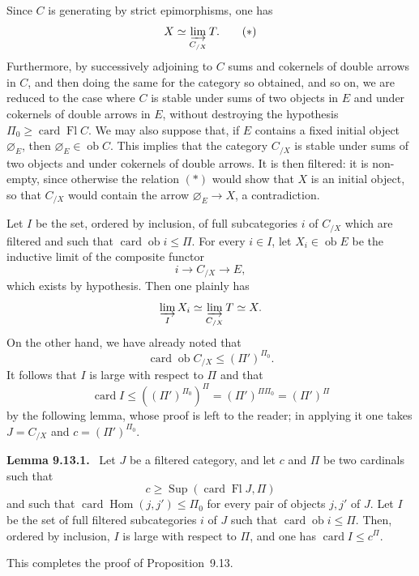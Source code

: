 \documentclass[11pt]{article}
\newcommand{\ob}{\operatorname{ob}}
\newcommand{\Hom}{\operatorname{Hom}}
\newcommand{\Sup}{\operatorname{Sup}}
\newcommand{\card}{\operatorname{card}}
\newcommand{\Fl}{\operatorname{Fl}}
\newcommand{\emptyE}{\varnothing_E}
\newenvironment{statement}[1]{\par\medskip\noindent\textbf{#1.}\ }{\par\medskip}
\begin{document}
Since $C$ is generating by strict epimorphisms, one has
\begin{equation*}
 X\simeq \varinjlim_{C_{/X}} T .\tag{$\ast$}
\end{equation*}
Furthermore, by successively adjoining to $C$ sums and cokernels of double arrows in $C$, and then doing the same for the category so obtained, and so on, we are reduced to the case where $C$ is stable under sums of two objects in $E$ and under cokernels of double arrows in $E$, without destroying the hypothesis $\Pi_0\geq\card\Fl C$. We may also suppose that, if $E$ contains a fixed initial object $\emptyE$, then $\emptyE\in\ob C$. This implies that the category $C_{/X}$ is stable under sums of two objects and under cokernels of double arrows. It is then filtered: it is non-empty, since otherwise the relation $(\ast)$ would show that $X$ is an initial object, so that $C_{/X}$ would contain the arrow $\emptyE\to X$, a contradiction.

Let $I$ be the set, ordered by inclusion, of full subcategories $i$ of $C_{/X}$ which are filtered and such that $\card\ob i\leq\Pi$. For every $i\in I$, let $X_i\in\ob E$ be the inductive limit of the composite functor
\[
 i\longrightarrow C_{/X}\longrightarrow E,
\]
which exists by hypothesis. Then one plainly has
\[
 \varinjlim_I X_i\simeq \varinjlim_{C_{/X}}T\simeq X.
\]
On the other hand, we have already noted that
\[
 \card\ob C_{/X}\leq(\Pi')^{\Pi_0}.
\]
It follows that $I$ is large with respect to $\Pi$ and that
\[
 \card I\leq ((\Pi')^{\Pi_0})^\Pi=(\Pi')^{\Pi\Pi_0}=(\Pi')^\Pi
\]
by the following lemma, whose proof is left to the reader; in applying it one takes $J=C_{/X}$ and $c=(\Pi')^{\Pi_0}$.

\begin{statement}{Lemma 9.13.1}
Let $J$ be a filtered category, and let $c$ and $\Pi$ be two cardinals such that
\[
 c\geq\Sup(\card\Fl J,\Pi)
\]
and such that $\card\Hom(j,j')\leq\Pi_0$ for every pair of objects $j,j'$ of $J$. Let $I$ be the set of full filtered subcategories $i$ of $J$ such that $\card\ob i\leq\Pi$. Then, ordered by inclusion, $I$ is large with respect to $\Pi$, and one has $\card I\leq c^\Pi$.
\end{statement}

This completes the proof of Proposition~9.13.
\end{document}
